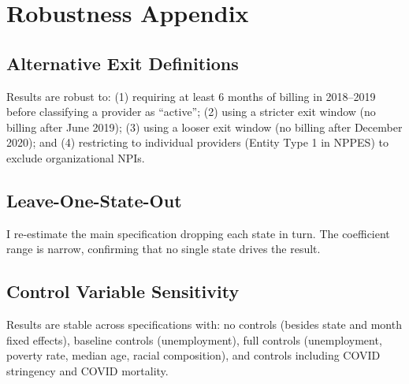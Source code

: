 \documentclass[12pt]{article}
\begin{document}
\section{Robustness Appendix}

\subsection{Alternative Exit Definitions}

Results are robust to: (1) requiring at least 6 months of billing in 2018--2019 before classifying a provider as ``active''; (2) using a stricter exit window (no billing after June 2019); (3) using a looser exit window (no billing after December 2020); and (4) restricting to individual providers (Entity Type 1 in NPPES) to exclude organizational NPIs.

\subsection{Leave-One-State-Out}

I re-estimate the main specification dropping each state in turn. The coefficient range is narrow, confirming that no single state drives the result.

\subsection{Control Variable Sensitivity}

Results are stable across specifications with: no controls (besides state and month fixed effects), baseline controls (unemployment), full controls (unemployment, poverty rate, median age, racial composition), and controls including COVID stringency and COVID mortality.
\end{document}
